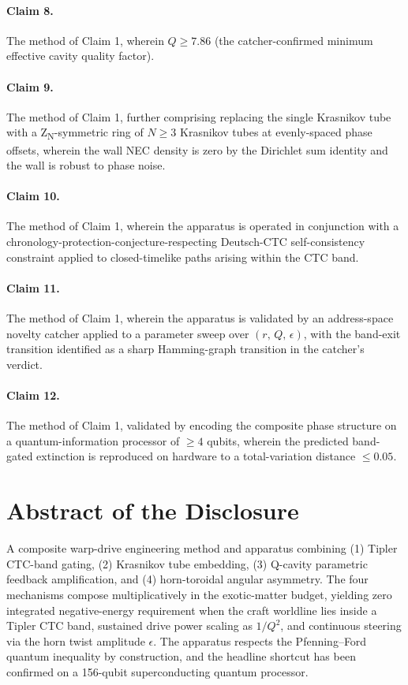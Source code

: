 \documentclass[11pt,a4paper]{article}
\begin{document}
\paragraph{Claim 8.} The method of Claim 1, wherein $Q \ge 7.86$ (the catcher-confirmed minimum effective cavity quality factor).

\paragraph{Claim 9.} The method of Claim 1, further comprising replacing the single Krasnikov tube with a Z\textsubscript{N}-symmetric ring of $N \ge 3$ Krasnikov tubes at evenly-spaced phase offsets, wherein the wall NEC density is zero by the Dirichlet sum identity and the wall is robust to phase noise.

\paragraph{Claim 10.} The method of Claim 1, wherein the apparatus is operated in conjunction with a chronology-protection-conjecture-respecting Deutsch-CTC self-consistency constraint applied to closed-timelike paths arising within the CTC band.

\paragraph{Claim 11.} The method of Claim 1, wherein the apparatus is validated by an address-space novelty catcher applied to a parameter sweep over $(r,\, Q,\, \epsilon)$, with the band-exit transition identified as a sharp Hamming-graph transition in the catcher's verdict.

\paragraph{Claim 12.} The method of Claim 1, validated by encoding the composite phase structure on a quantum-information processor of $\ge 4$ qubits, wherein the predicted band-gated extinction is reproduced on hardware to a total-variation distance $\le 0.05$.

\section{Abstract of the Disclosure}

A composite warp-drive engineering method and apparatus combining (1) Tipler CTC-band gating, (2) Krasnikov tube embedding, (3) Q-cavity parametric feedback amplification, and (4) horn-toroidal angular asymmetry. The four mechanisms compose multiplicatively in the exotic-matter budget, yielding zero integrated negative-energy requirement when the craft worldline lies inside a Tipler CTC band, sustained drive power scaling as $1/Q^2$, and continuous steering via the horn twist amplitude $\epsilon$. The apparatus respects the Pfenning--Ford quantum inequality by construction, and the headline shortcut has been confirmed on a 156-qubit superconducting quantum processor.
\end{document}
